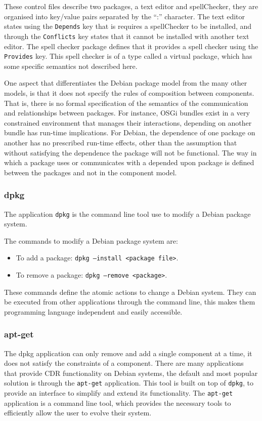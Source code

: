 These control files describe two packages, a text editor and spellChecker, they are organised into key/value pairs separated by the ``:'' character.
The text editor states using the \texttt{Depends} key that is requires a spellChecker to be installed, 
and through the \texttt{Conflicts} key states that it cannot be installed with another text editor.
The spell checker package defines that it provides a spell checker using the \texttt{Provides} key.
This spell checker is of a type called a virtual package, which has some specific semantics not described here.

One aspect that differentiates the Debian package model from the many other models, is that it does not specify the rules of composition between components.
That is, there is no formal specification of the semantics of the communication and relationships between packages.
For instance, OSGi bundles exist in a very constrained environment that manages their interactions, depending on another bundle has run-time implications.
For Debian, the dependence of one package on another has no prescribed run-time effects, other than the assumption that without satisfying the dependence the package will not be functional.
The way in which a package uses or communicates with a depended upon package is defined between the packages and not in the component model.

\subsubsection{dpkg}
The application \texttt{dpkg} is the command line tool use to modify a Debian package system.

The commands to modify a Debian package system are:
\begin{itemize}
  \item To add a package: \texttt{dpkg --install <package file>}.
  \item To remove a package: \texttt{dpkg --remove <package>}.
\end{itemize}

These commands define the atomic actions to change a Debian system.
They can be executed from other applications through the command line, this makes them programming language independent and easily accessible. 

\subsubsection{apt-get}
The dpkg application can only remove and add a single component at a time, it does not satisfy the constraints of a component.
There are many applications that provide CDR functionality on Debian systems, the default and most popular solution is through the \texttt{apt-get} application.
This tool is built on top of \texttt{dpkg}, to provide an interface to simplify and extend its functionality.
The \texttt{apt-get} application is a command line tool, which provides the necessary tools to efficiently allow the user to evolve their system.

